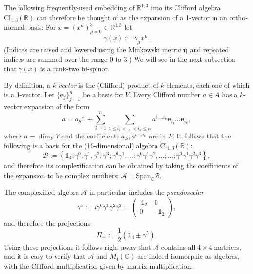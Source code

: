 \documentclass[12pt]{article}
\theoremstyle{definition}
\numberwithin{equation}{section}
\newcommand{\be}{\mathbf{e}}
\newcommand{\beq}{\begin{equation}}
\newcommand{\eeq}{\end{equation}}
\newcommand{\Id}{\mathds{1}}
\newcommand{\cA}{\mathcal{A}}
\newcommand{\cB}{\mathcal{B}}
\newcommand{\Cset}{{\mathbb C}}
\newcommand{\Rset}{{\mathbb R}}
\newcommand{\ga}{\gamma}
\newcommand{\half}{\frac{1}{2}}
\newcommand{\Span}{\mbox{Span}}
\begin{document}
The following frequently-used embedding of $\Rset^{1,3}$ into its Clifford algebra $\mbox{Cl}_{1,3}(\Rset)$ can therefore be 
thought of as the expansion of a 1-vector in an ortho-normal basis:  For $x = (x^\mu)_{\mu=0}^3 \in \Rset^{1,3}$ let 
\beq\label{embed}
\ga(x) := \ga_\mu x^\mu.
\eeq 
(Indices are raised and lowered using the Minkowski metric $\boldsymbol{\eta}$ and repeated indices are summed over the range 0 to 3.)
 We will see in the next subsection that $\ga(x)$ is a rank-two bi-spinor.  

 By definition, a {\em $k$-vector} is the (Clifford) product of $k$ elements, each one of which is a 1-vector. 
 Let $\{\be_j\}_{j=1}^n$ be a basis for $V$. Every Clifford number $a\in A$ has a $k$-vector expansion of the form 
\beq a = a_S\Id + \sum_{k=1}^{n}\sum_{1\leq i_1<\dots<i_k\leq n} a^{i_1\dots i_k} \be_{i_1}\dots\be_{i_k},
\eeq
where $n=\dim_F V$ and the coefficients $a_S,a^{i_1\dots i_k}$ are in $F$.  
 It follows that the following is a basis for the (16-dimensional) algebra $\mbox{Cl}_{1,3}(\Rset)$:
\beq\label{basis}
\cB := \left\{ \mathds{1}_4; \ga^0, \ga^1, \ga^2,\ga^3; \ga^0\ga^1, \dots; \ga^0\ga^1\ga^2, \dots;\dots;\ga^0\ga^1\ga^2\ga^3 \right\},
\eeq
and therefore its complexification can be obtained by taking the coefficients of the expansion to be complex numbers: $\cA = \Span_\Cset \cB$.  

 The complexified algebra $\cA$ in particular includes the {\em pseudoscalar}
\beq 
\ga^5 := i \ga^0 \ga^1 \ga^2 \ga^3 
= \begin{pmatrix} \, \Id_2 & \ 0 \\ 0 & -\Id_2\end{pmatrix},
\eeq
and therefore the projections
\beq\label{def:projections}
\Pi_\pm := \half( \Id_4 \pm \ga^5).
\eeq
Using these projections it follows right away that $\cA$ contains all $4\times 4$ matrices, 
and it is easy to verify that $\cA$ and $M_4(\Cset)$ are indeed isomorphic as algebras, with the 
Clifford multiplication given by matrix multiplication.
\end{document}
